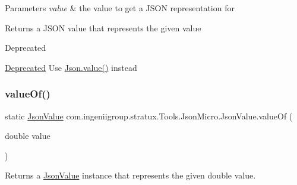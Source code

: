 \begin{DoxyParams}{Parameters}
{\em value} & the value to get a J\+S\+ON representation for \\
\hline
\end{DoxyParams}
\begin{DoxyReturn}{Returns}
a J\+S\+ON value that represents the given value 
\end{DoxyReturn}
\begin{DoxyRefDesc}{Deprecated}
\item[\hyperlink{deprecated__deprecated000012}{Deprecated}]Use {\ttfamily \hyperlink{classcom_1_1ingeniigroup_1_1stratux_1_1_tools_1_1_json_micro_1_1_json_aa7a17dbf2bbb667284cb5a86d404bf6d}{Json.\+value()}} instead \end{DoxyRefDesc}
\mbox{\label{classcom_1_1ingeniigroup_1_1stratux_1_1_tools_1_1_json_micro_1_1_json_value_a83b19c00df70ffcbd920b854c6200545}} 
\subsubsection{\texorpdfstring{value\+Of()}{valueOf()}\hspace{0.1cm}{\footnotesize\ttfamily [4/6]}}
{\footnotesize\ttfamily static \hyperlink{classcom_1_1ingeniigroup_1_1stratux_1_1_tools_1_1_json_micro_1_1_json_value}{Json\+Value} com.\+ingeniigroup.\+stratux.\+Tools.\+Json\+Micro.\+Json\+Value.\+value\+Of (\begin{DoxyParamCaption}\item[{double}]{value }\end{DoxyParamCaption})\hspace{0.3cm}{\ttfamily [static]}}

Returns a \hyperlink{classcom_1_1ingeniigroup_1_1stratux_1_1_tools_1_1_json_micro_1_1_json_value}{Json\+Value} instance that represents the given {\ttfamily double} value.



